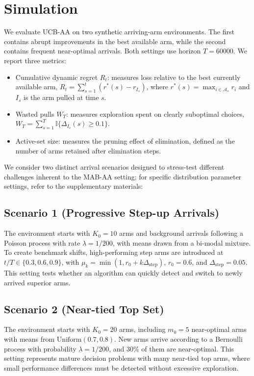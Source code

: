 \documentclass[
  12pt]{article}
\begin{document}
\section{Simulation}\label{sec: simulation}
We evaluate UCB-AA on two synthetic arriving-arm environments. The first
contains abrupt improvements in the best available arm, while the second
contains frequent near-optimal arrivals. Both settings use horizon \(T=60000\).
We report three metrics:
\begin{itemize}
	    \item Cumulative dynamic regret \(R_t\): measures loss relative to the best
	    currently available arm,
	    \(R_t=\sum_{s=1}^t(r^*(s)-r_{I_s})\), where
	    \(r^*(s)=\max_{i\in\mathcal A_s}r_i\) and \(I_s\) is the arm pulled at
	    time \(s\).
    \item Wasted pulls \(W_T\): measures exploration spent on clearly suboptimal
    choices,
    \(W_T=\sum_{s=1}^T\mathbb I\{\Delta_{I_s}(s)\ge0.1\}\).
    \item Active-set size: measures the pruning effect of elimination, defined
    as the number of arms retained after elimination steps.
\end{itemize}

We consider two distinct arrival scenarios designed to stress-test different challenges inherent to the MAB-AA setting; for specific distribution parameter settings, refer to the supplementary materials: 
\subsection*{Scenario 1 (Progressive Step-up Arrivals)}
The environment starts with \(K_0=10\) arms and background arrivals following a
Poisson process with rate \(\lambda=1/200\), with means drawn from a bi-modal
mixture. To create benchmark shifts, high-performing step arms are introduced at
\(t/T\in\{0.3,0.6,0.9\}\), with
\(\mu_k=\min(1,r_0+k\Delta_{\mathrm{step}})\), \(r_0=0.6\), and
\(\Delta_{\mathrm{step}}=0.05\). This setting tests whether an algorithm can
quickly detect and switch to newly arrived superior arms.


\subsection*{Scenario 2 (Near-tied Top Set)}
The environment starts with \(K_0=20\) arms, including \(m_0=5\) near-optimal
arms with means from \(\mathrm{Uniform}(0.7,0.8)\). New arms arrive according
to a Bernoulli process with probability \(\lambda=1/200\), and \(30\%\) of them
are near-optimal. This setting represents mature decision problems with many
near-tied top arms, where small performance differences must be detected without
excessive exploration.
\end{document}
